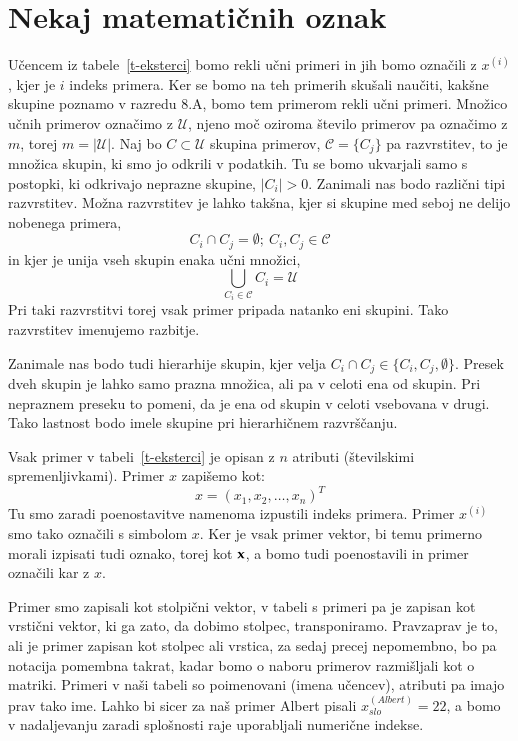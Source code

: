 \section{Nekaj matematičnih oznak}

Učencem iz tabele~\ref{t-eksterci} bomo rekli učni primeri in jih bomo
označili z $x^{(i)}$, kjer je $i$ indeks primera. Ker se bomo na teh
primerih skušali naučiti, kakšne skupine poznamo v razredu 8.A, bomo
tem primerom rekli učni primeri. Množico učnih primerov označimo z
$\mathcal{U}$, njeno moč oziroma število primerov pa označimo z $m$,
torej $m=|\mathcal{U}|$. Naj bo $C\subset \mathcal{U}$ skupina
primerov, $\mathcal{C}=\{C_j\}$ pa razvrstitev, to je množica skupin,
ki smo jo odkrili v podatkih. Tu se bomo ukvarjali samo s postopki, ki
odkrivajo neprazne skupine, $|C_i|>0$. Zanimali nas bodo različni tipi
razvrstitev. Možna razvrstitev je lahko takšna, kjer si skupine med
seboj ne delijo nobenega primera,
%
$$C_i\cap C_j=\emptyset;\ C_i,C_j\in\mathcal{C}$$
%
in kjer je unija vseh skupin enaka učni množici,
%
$$ \displaystyle\bigcup_{C_i\in\mathcal{C}}C_i=\mathcal{U} $$ 
%
Pri taki razvrstitvi torej vsak primer pripada natanko eni
skupini. Tako razvrstitev imenujemo razbitje.

Zanimale nas bodo tudi hierarhije skupin, kjer velja $C_i\cap
C_j\in\{C_i,C_j,\emptyset\}$.  Presek dveh skupin je lahko samo prazna
množica, ali pa v celoti ena od skupin. Pri nepraznem preseku to
pomeni, da je ena od skupin v celoti vsebovana v drugi. Tako lastnost
bodo imele skupine pri hierarhičnem razvrščanju.

Vsak primer v tabeli~\ref{t-eksterci} je opisan z $n$ atributi
(številskimi spremenljivkami). Primer $x$ zapišemo kot:
%
$$ x=(x_1,x_2, \ldots, x_n)^T $$ 
%
Tu smo zaradi poenostavitve namenoma izpustili indeks primera. Primer
$x^{(i)}$ smo tako označili s simbolom $x$. Ker je vsak primer vektor,
bi temu primerno morali izpisati tudi oznako, torej kot $\bf x$, a
bomo tudi poenostavili in primer označili kar z $x$.

Primer smo zapisali kot stolpični vektor, v tabeli s primeri pa je
zapisan kot vrstični vektor, ki ga zato, da dobimo stolpec,
transponiramo. Pravzaprav je to, ali je primer zapisan kot stolpec ali
vrstica, za sedaj precej nepomembno, bo pa notacija pomembna takrat,
kadar bomo o naboru primerov razmišljali kot o matriki. Primeri v naši
tabeli so poimenovani (imena učencev), atributi pa imajo prav tako
ime. Lahko bi sicer za naš primer Albert pisali
$x^{(Albert)}_{slo}=22$, a bomo v nadaljevanju zaradi splošnosti raje
uporabljali numerične indekse.

